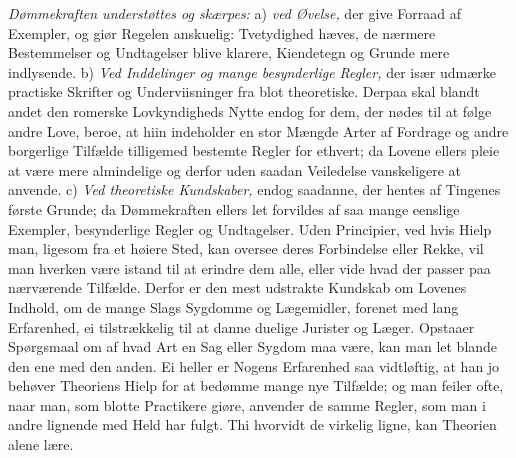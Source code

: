 \documentclass[12pt,a4paper]{article}
\newcommand{\opage}[1]{\marginnote{\footnotesize\textit{[#1]}}}
\begin{document}
\emph{Dømmekraften understøttes og skærpes:} a) \emph{ved Øvelse,} der give Forraad af
Exempler, og giør Regelen anskuelig: Tvetydighed hæves, de nærmere Bestemmelser og
Undtagelser blive klarere, Kiendetegn og Grunde mere indlysende. b) \emph{Ved Inddelinger
og mange besynderlige Regler,} der især udmærke practiske Skrifter og Underviisninger fra
blot theoretiske. Derpaa skal blandt andet den romerske Lovkyndigheds Nytte endog for dem,
der nødes
\opage{164} til at følge andre Love, beroe, at hiin indeholder en stor Mængde Arter af Fordrage og
andre borgerlige Tilfælde tilligemed bestemte Regler for ethvert; da Lovene ellers pleie
at være mere almindelige og derfor uden saadan Veiledelse vanskeligere at anvende.
c) \emph{Ved theoretiske Kundskaber,} endog saadanne, der hentes af Tingenes første
Grunde; da Dømmekraften ellers let forvildes af saa mange eenslige Exempler, besynderlige
Regler og Undtagelser. Uden Principier, ved hvis Hielp man, ligesom fra et høiere Sted,
kan oversee deres Forbindelse eller Rekke, vil man hverken være istand til at erindre dem
alle, eller vide hvad der passer paa nærværende Tilfælde. Derfor er den mest udstrakte
Kundskab om Lovenes Indhold, om de mange Slags Sygdomme og Lægemidler, forenet med lang
Erfarenhed, ei tilstrækkelig til at danne duelige Jurister og Læger. Opstaaer Spørgsmaal
om af hvad Art en Sag eller Sygdom maa være, kan man let blande den ene med den anden. Ei
heller er Nogens Erfarenhed saa vidtløftig, at han jo behøver Theoriens Hielp for at
bedømme mange nye Tilfælde; og man feiler ofte, naar man, som blotte Practikere giøre,
anvender de samme Regler, som man i andre lignende med Held har fulgt. Thi hvorvidt de
virkelig ligne, kan Theorien alene lære.
\end{document}
